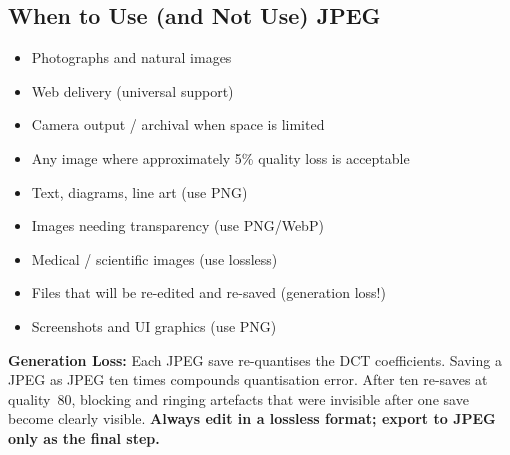 \subsection{When to Use (and Not Use) JPEG}

\begin{minipage}[t]{0.48\linewidth}
\begin{tcolorbox}[colback=LightGreen!20, colframe=green!50!black,
                  title=\textbf{Use JPEG for}, sharp corners]
\begin{itemize}[nosep, leftmargin=*]
  \item Photographs and natural images
  \item Web delivery (universal support)
  \item Camera output / archival when space is limited
  \item Any image where approximately 5\% quality loss is acceptable
\end{itemize}
\end{tcolorbox}
\end{minipage}\hfill
\begin{minipage}[t]{0.48\linewidth}
\begin{tcolorbox}[colback=LightRed!20, colframe=red!75!black,
                  title=\textbf{Avoid JPEG for}, sharp corners]
\begin{itemize}[nosep, leftmargin=*]
  \item Text, diagrams, line art (use PNG)
  \item Images needing transparency (use PNG/WebP)
  \item Medical / scientific images (use lossless)
  \item Files that will be re-edited and re-saved (generation loss!)
  \item Screenshots and UI graphics (use PNG)
\end{itemize}
\end{tcolorbox}
\end{minipage}

\vspace{10pt}

\begin{warningbox}
\textbf{Generation Loss:} Each JPEG save re-quantises the DCT coefficients. Saving a JPEG as JPEG ten times compounds quantisation error. After ten re-saves at quality~80, blocking and ringing artefacts that were invisible after one save become clearly visible. \textbf{Always edit in a lossless format; export to JPEG only as the final step.}
\end{warningbox}

